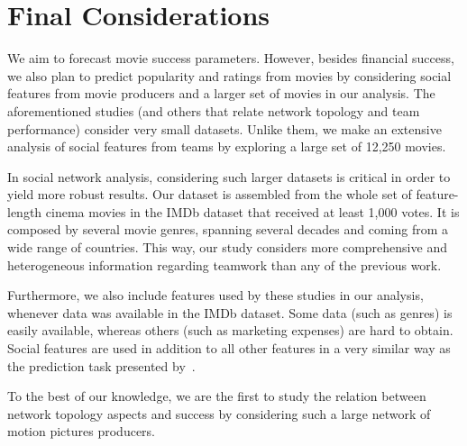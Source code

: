 \section{Final Considerations}
\label{sec:related_final}
We aim to forecast movie success parameters. However, besides financial
success, we also plan to predict popularity and ratings from movies by
considering social features from movie producers and a larger set of movies in
our analysis. The aforementioned studies (and others that relate network
topology and team performance) consider very small datasets. Unlike them, we
make an extensive analysis of social features from teams by exploring a large
set of 12,250 movies.

In social network analysis, considering such larger datasets is critical in
order to yield more robust results. Our dataset is assembled from the whole set
of feature-length cinema movies in the IMDb dataset that received at least
1,000 votes.  It is composed by several movie genres, spanning several decades
and coming from a wide range of countries. This way, our study considers more
comprehensive and heterogeneous information regarding teamwork than any of the
previous work.

Furthermore, we also include features used by these studies in our analysis,
whenever data was available in the IMDb dataset. Some data (such as genres) is
easily available, whereas others (such as marketing expenses) are hard to
obtain.  Social features are used in addition to all other features in a very
similar way as the prediction task presented by~\cite{COSN2013}.

To the best of our knowledge, we are the first to study the relation between
network topology aspects and success by considering such a large network of
motion pictures producers.
